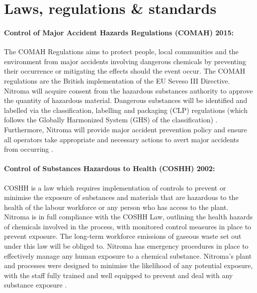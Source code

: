 \section{Laws, regulations \& standards}

\paragraph{Control of Major Accident Hazards Regulations (COMAH) 2015:} 

The COMAH Regulations aims to protect people, local communities and the environment from major accidents involving dangerous chemicals by preventing their occurrence or mitigating the effects should the event occur. The COMAH regulations are the British implementation of the EU Seveso III Directive. Nitroma will acquire consent from the hazardous substances authority to approve the quantity of hazardous material. Dangerous substances will be identified and labelled via the classification, labelling and packaging (CLP) regulations (which follows the Globally Harmonized System (GHS) of the classification) \cite{health_and_safety_executive_chemical_nodate}. Furthermore, Nitroma will provide major accident prevention policy and ensure all operators take appropriate and necessary actions to avert major accidents from occurring \cite{health_and_safety_executive_understanding_2015}. 

\paragraph{Control of Substances Hazardous to Health (COSHH) 2002:}

COSHH is a law which requires implementation of controls to prevent or minimise the exposure of substances and materials that are hazardous to the health of the labour workforce or any person who has access to the plant. Nitroma is in full compliance with the COSHH Law, outlining the health hazards of chemicals involved in the process, with monitored control measures in place to prevent exposure. The long-term workforce emissions of gaseous waste set out under this law will be obliged to. Nitroma has emergency procedures in place to effectively manage any human exposure to a chemical substance. Nitroma’s plant and processes were designed to minimise the likelihood of any potential exposure, with the staff fully trained and well equipped to prevent and deal with any substance exposure \cite{health_and_safety_executive_control_nodate}. 

